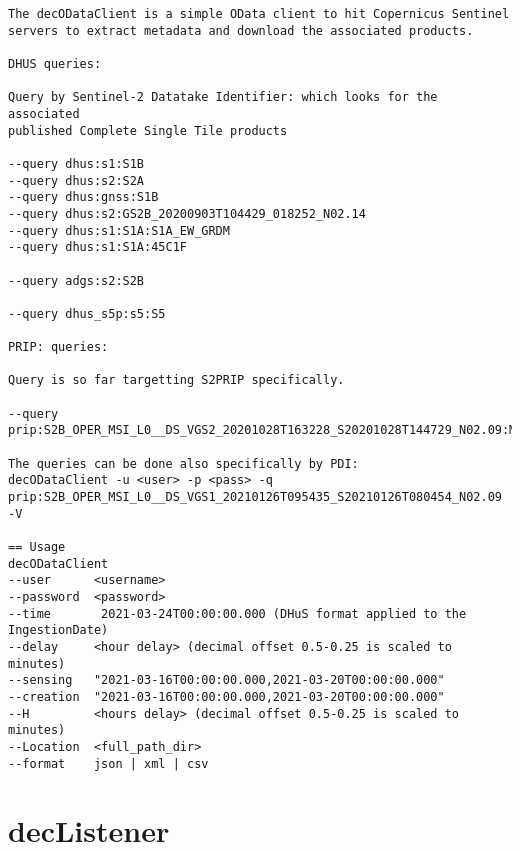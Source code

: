 \documentclass[dec_sum_main.tex]{subfiles}
\begin{document}
\begin{verbatim}
The decODataClient is a simple OData client to hit Copernicus Sentinel
servers to extract metadata and download the associated products.

DHUS queries:

Query by Sentinel-2 Datatake Identifier: which looks for the associated
published Complete Single Tile products 

--query dhus:s1:S1B
--query dhus:s2:S2A
--query dhus:gnss:S1B
--query dhus:s2:GS2B_20200903T104429_018252_N02.14
--query dhus:s1:S1A:S1A_EW_GRDM
--query dhus:s1:S1A:45C1F

--query adgs:s2:S2B

--query dhus_s5p:s5:S5

PRIP: queries:

Query is so far targetting S2PRIP specifically.

--query prip:S2B_OPER_MSI_L0__DS_VGS2_20201028T163228_S20201028T144729_N02.09:MSI_L0__GR

The queries can be done also specifically by PDI:
decODataClient -u <user> -p <pass> -q prip:S2B_OPER_MSI_L0__DS_VGS1_20210126T095435_S20210126T080454_N02.09 -V

== Usage
decODataClient 
--user      <username>
--password  <password>
--time       2021-03-24T00:00:00.000 (DHuS format applied to the IngestionDate)
--delay     <hour delay> (decimal offset 0.5-0.25 is scaled to minutes)
--sensing   "2021-03-16T00:00:00.000,2021-03-20T00:00:00.000"
--creation  "2021-03-16T00:00:00.000,2021-03-20T00:00:00.000"
--H         <hours delay> (decimal offset 0.5-0.25 is scaled to minutes)
--Location  <full_path_dir>
--format    json | xml | csv
\end{verbatim}	
	
\section{decListener}
\end{document}
